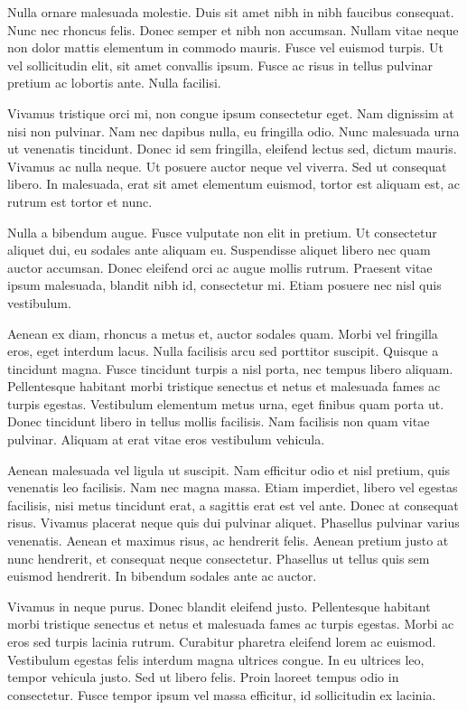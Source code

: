 \documentclass{article}
\begin{document}
Nulla ornare malesuada molestie. Duis sit amet nibh in nibh faucibus consequat. Nunc nec rhoncus felis. Donec semper et nibh non accumsan. Nullam vitae neque non dolor mattis elementum in commodo mauris. Fusce vel euismod turpis. Ut vel sollicitudin elit, sit amet convallis ipsum. Fusce ac risus in tellus pulvinar pretium ac lobortis ante. Nulla facilisi.

Vivamus tristique orci mi, non congue ipsum consectetur eget. Nam dignissim at nisi non pulvinar. Nam nec dapibus nulla, eu fringilla odio. Nunc malesuada urna ut venenatis tincidunt. Donec id sem fringilla, eleifend lectus sed, dictum mauris. Vivamus ac nulla neque. Ut posuere auctor neque vel viverra. Sed ut consequat libero. In malesuada, erat sit amet elementum euismod, tortor est aliquam est, ac rutrum est tortor et nunc.

Nulla a bibendum augue. Fusce vulputate non elit in pretium. Ut consectetur aliquet dui, eu sodales ante aliquam eu. Suspendisse aliquet libero nec quam auctor accumsan. Donec eleifend orci ac augue mollis rutrum. Praesent vitae ipsum malesuada, blandit nibh id, consectetur mi. Etiam posuere nec nisl quis vestibulum.

Aenean ex diam, rhoncus a metus et, auctor sodales quam. Morbi vel fringilla eros, eget interdum lacus. Nulla facilisis arcu sed porttitor suscipit. Quisque a tincidunt magna. Fusce tincidunt turpis a nisl porta, nec tempus libero aliquam. Pellentesque habitant morbi tristique senectus et netus et malesuada fames ac turpis egestas. Vestibulum elementum metus urna, eget finibus quam porta ut. Donec tincidunt libero in tellus mollis facilisis. Nam facilisis non quam vitae pulvinar. Aliquam at erat vitae eros vestibulum vehicula.

Aenean malesuada vel ligula ut suscipit. Nam efficitur odio et nisl pretium, quis venenatis leo facilisis. Nam nec magna massa. Etiam imperdiet, libero vel egestas facilisis, nisi metus tincidunt erat, a sagittis erat est vel ante. Donec at consequat risus. Vivamus placerat neque quis dui pulvinar aliquet. Phasellus pulvinar varius venenatis. Aenean et maximus risus, ac hendrerit felis. Aenean pretium justo at nunc hendrerit, et consequat neque consectetur. Phasellus ut tellus quis sem euismod hendrerit. In bibendum sodales ante ac auctor.

Vivamus in neque purus. Donec blandit eleifend justo. Pellentesque habitant morbi tristique senectus et netus et malesuada fames ac turpis egestas. Morbi ac eros sed turpis lacinia rutrum. Curabitur pharetra eleifend lorem ac euismod. Vestibulum egestas felis interdum magna ultrices congue. In eu ultrices leo, tempor vehicula justo. Sed ut libero felis. Proin laoreet tempus odio in consectetur. Fusce tempor ipsum vel massa efficitur, id sollicitudin ex lacinia.
\end{document}

